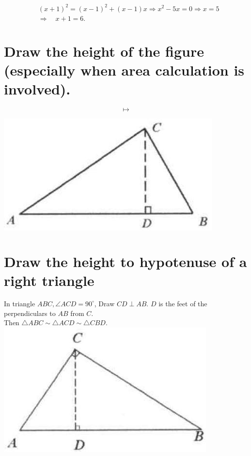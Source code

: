 \documentclass[10pt]{article}
\begin{document}
\[
\begin{aligned}
& (x+1)^{2}=(x-1)^{2}+(x-1) x \Rightarrow x^{2}-5 x=0 \Rightarrow x=5 \\
& \Rightarrow \quad x+1=6 .
\end{aligned}
\]

\section*{Draw the height of the figure (especially when area calculation is involved).}
\[
\longmapsto
\]

\begin{center}
\includegraphics[max width=\textwidth]{2025_04_17_97bc1f7e44d93c271a88g-074}
\end{center}

\section*{Draw the height to hypotenuse of a right triangle}
In triangle \(A B C, \angle A C D=90^{\circ}\), Draw \(C D \perp A B\). \(D\) is the feet of the perpendiculars to \(A B\) from \(C\).\\
Then \(\triangle A B C \sim \triangle A C D \sim \triangle C B D\).\\
\includegraphics[max width=\textwidth, center]{2025_04_17_97bc1f7e44d93c271a88g-074(1)}
\end{document}
